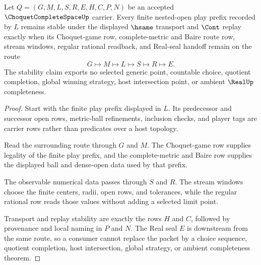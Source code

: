 \begin{theorem}
\label{thm:choquet-complete-space-nested-play-stability}
Let $Q=(G,M,L,S,R,E,H,C,P,N)$ be an accepted $\ChoquetCompleteSpaceUp$ carrier. Every finite nested-open play prefix recorded by $L$ remains stable under the displayed $\hsame$ transport and $\Cont$ replay exactly when its Choquet-game row, complete-metric and Baire route row, stream windows, regular rational readback, and Real-seal handoff remain on the route
$$
G \longmapsto M \longmapsto L \longmapsto S \longmapsto R \longmapsto E .
$$
The stability claim exports no selected generic point, countable choice, quotient completion, global winning strategy, host intersection point, or ambient $\RealUp$ completeness.
\end{theorem}
\begin{proof}
Start with the finite play prefix displayed in $L$. Its predecessor and successor open rows, metric-ball refinements, inclusion checks, and player tags are carrier rows rather than predicates over a host topology.

Read the surrounding route through $G$ and $M$. The Choquet-game row supplies legality of the finite play prefix, and the complete-metric and Baire row supplies the displayed ball and dense-open data used by that prefix.

The observable numerical data passes through $S$ and $R$. The stream windows choose the finite centers, radii, open rows, and tolerances, while the regular rational row reads those values without adding a selected limit point.

Transport and replay stability are exactly the rows $H$ and $C$, followed by provenance and local naming in $P$ and $N$. The Real seal $E$ is downstream from the same route, so a consumer cannot replace the packet by a choice sequence, quotient completion, host intersection, global strategy, or ambient completeness theorem.
\end{proof}


